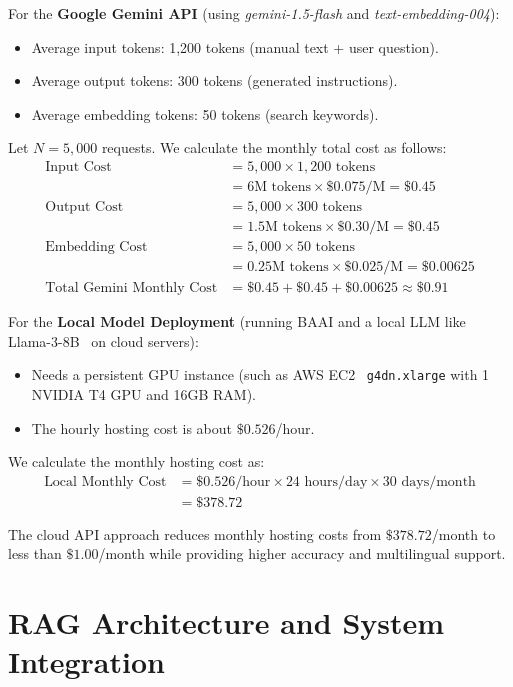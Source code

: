 \documentclass[12pt,a4paper]{report}
\begin{document}
For the \textbf{Google Gemini API} (using \textit{gemini-1.5-flash} and \textit{text-embedding-004}):
\begin{itemize}
    \item Average input tokens: 1,200 tokens (manual text + user question).
    \item Average output tokens: 300 tokens (generated instructions).
    \item Average embedding tokens: 50 tokens (search keywords).
\end{itemize}
Let $N = 5,000$ requests. We calculate the monthly total cost as follows:
\begin{align}
\text{Input Cost} &= 5,000 \times 1,200 \text{ tokens} \nonumber \\
&= 6\text{M tokens} \times \$0.075/\text{M} = \$0.45 \\
\text{Output Cost} &= 5,000 \times 300 \text{ tokens} \nonumber \\
&= 1.5\text{M tokens} \times \$0.30/\text{M} = \$0.45 \\
\text{Embedding Cost} &= 5,000 \times 50 \text{ tokens} \nonumber \\
&= 0.25\text{M tokens} \times \$0.025/\text{M} = \$0.00625 \\
\text{Total Gemini Monthly Cost} &= \$0.45 + \$0.45 + \$0.00625 \approx \$0.91
\end{align}

For the \textbf{Local Model Deployment} (running BAAI and a local LLM like Llama-3-8B~\cite{llama3} on cloud servers):
\begin{itemize}
    \item Needs a persistent GPU instance (such as AWS EC2~\cite{aws_ec2} \texttt{g4dn.xlarge} with 1 NVIDIA T4 GPU and 16GB RAM).
    \item The hourly hosting cost is about $\$0.526$/hour.
\end{itemize}
We calculate the monthly hosting cost as:
\begin{align}
\text{Local Monthly Cost} &= \$0.526/\text{hour} \times 24\text{ hours/day} \times 30\text{ days/month} \nonumber \\
&= \$378.72
\end{align}

The cloud API approach reduces monthly hosting costs from $\$378.72$/month to less than $\$1.00$/month while providing higher accuracy and multilingual support.

\section{RAG Architecture and System Integration}
\end{document}
